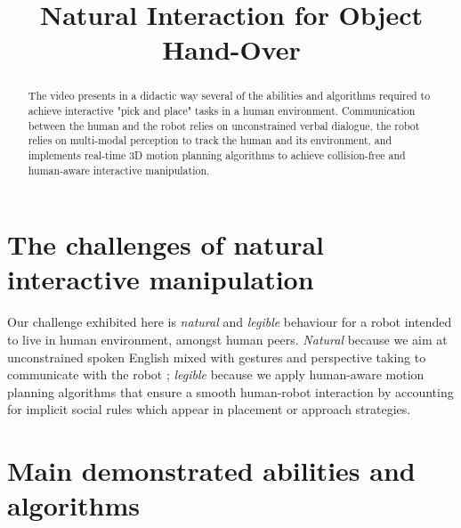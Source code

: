 \documentclass[conference]{IEEEtran}
\begin{document}
%
\title{Natural Interaction for Object Hand-Over}


\author{
}
\maketitle


\begin{abstract}

The video presents in a didactic way several of the abilities and algorithms
required to achieve interactive "pick and place" tasks in a human environment.
Communication between the human and the robot relies on unconstrained verbal
dialogue, the robot relies on multi-modal perception to track the human and its
environment, and implements real-time 3D motion planning algorithms to achieve
collision-free and human-aware interactive manipulation.

\end{abstract}


\section{The challenges of natural interactive manipulation}

Our challenge exhibited here is \emph{natural} and \emph{legible} behaviour for a robot intended to 
live in human environment, amongst human peers.
\emph{Natural} because we aim at unconstrained spoken English mixed with
gestures and perspective taking to communicate with the robot ; \emph{legible}
because we apply human-aware motion planning algorithms that ensure a smooth human-robot interaction by accounting for implicit social rules which appear in placement or approach strategies.

\section{Main demonstrated abilities and algorithms}
\end{document}
